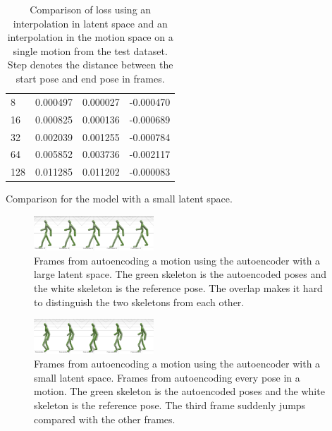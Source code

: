 \begin{table}[h]
\begin{subtable}[h]{0.45\textwidth}
\begin{tabular}{@{}llll@{}}
8 & 0.000497 & 0.000027 & -0.000470 \\
16 & 0.000825 & 0.000136 & -0.000689 \\
32 & 0.002039 & 0.001255 & -0.000784 \\
64 & 0.005852 & 0.003736 & -0.002117 \\
128 & 0.011285 & 0.011202 & -0.000083 \\  \bottomrule
        \end{tabular}
        \caption{Comparison for the model with a small latent space.}
        \label{tab:ae-eval-small}
    \end{subtable}
     \caption{Comparison of loss using an interpolation in latent space and an interpolation in the motion space on a single motion from the test dataset. Step denotes the distance between the start pose and end pose in frames.}
     \label{tab:ae-eval}
\end{table}

\clearpage

\begin{figure}[H]
\centering
\includegraphics[width=0.4\textwidth]{img/ae-large-motion}
\caption{Frames from autoencoding a motion using the autoencoder with a large latent space. The green skeleton is the autoencoded poses and the white skeleton is the reference pose. The overlap makes it hard to distinguish the two skeletons from each other.}
\label{fig:ae-large-motion}
\end{figure}

\begin{figure}[H]
\centering
\includegraphics[width=0.4\textwidth]{img/ae-small-motion}
\caption{Frames from autoencoding a motion using the autoencoder with a small latent space. Frames from autoencoding every pose in a motion. The green skeleton is the autoencoded poses and the white skeleton is the reference pose. The third frame suddenly jumps compared with the other frames.}
\label{fig:ae-small-motion}
\end{figure}


